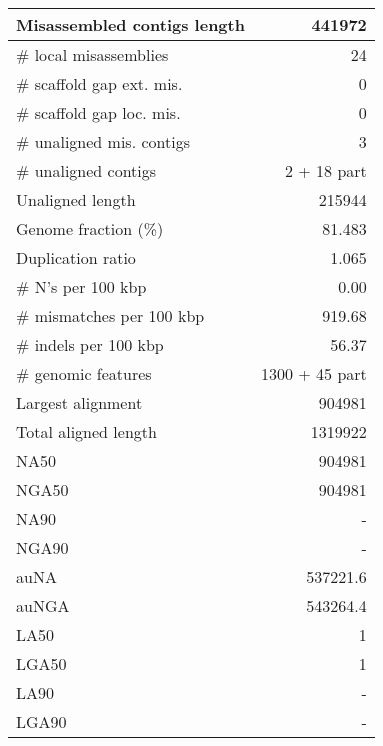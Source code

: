 \documentclass[12pt,a4paper]{article}
\begin{document}
\begin{table}[ht]
\begin{center}
\begin{tabular}{|l*{1}{|r}|}
Misassembled contigs length & 441972 \\ \hline
\# local misassemblies & 24 \\ \hline
\# scaffold gap ext. mis. & 0 \\ \hline
\# scaffold gap loc. mis. & 0 \\ \hline
\# unaligned mis. contigs & 3 \\ \hline
\# unaligned contigs & 2 + 18 part \\ \hline
Unaligned length & 215944 \\ \hline
Genome fraction (\%) & 81.483 \\ \hline
Duplication ratio & 1.065 \\ \hline
\# N's per 100 kbp & 0.00 \\ \hline
\# mismatches per 100 kbp & 919.68 \\ \hline
\# indels per 100 kbp & 56.37 \\ \hline
\# genomic features & 1300 + 45 part \\ \hline
Largest alignment & 904981 \\ \hline
Total aligned length & 1319922 \\ \hline
NA50 & 904981 \\ \hline
NGA50 & 904981 \\ \hline
NA90 & - \\ \hline
NGA90 & - \\ \hline
auNA & 537221.6 \\ \hline
auNGA & 543264.4 \\ \hline
LA50 & 1 \\ \hline
LGA50 & 1 \\ \hline
LA90 & - \\ \hline
LGA90 & - \\ \hline
\end{tabular}
\end{center}
\end{table}
\end{document}
